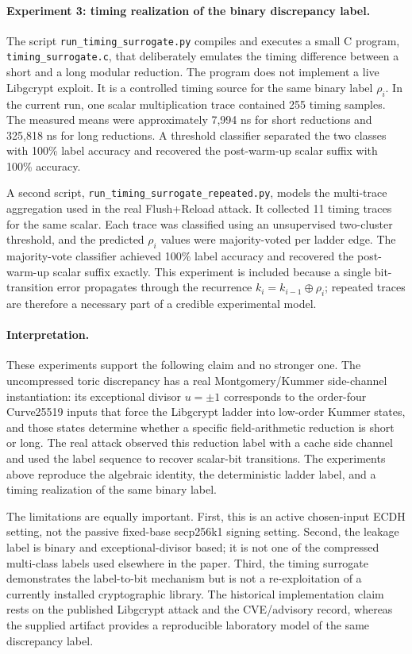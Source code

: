 \paragraph{Experiment 3: timing realization of the binary discrepancy label.}
The script \texttt{run\_timing\_surrogate.py} compiles and executes a small C
program, \texttt{timing\_surrogate.c}, that deliberately emulates the timing
difference between a short and a long modular reduction.  The program does not
implement a live Libgcrypt exploit.  It is a controlled timing source for the
same binary label \(\rho_i\).  In the current run, one scalar multiplication
trace contained 255 timing samples.  The measured means were approximately
7,994 ns for short reductions and 325,818 ns for long reductions.  A threshold
classifier separated the two classes with 100\% label accuracy and recovered the
post-warm-up scalar suffix with 100\% accuracy.

A second script, \texttt{run\_timing\_surrogate\_repeated.py}, models the
multi-trace aggregation used in the real Flush+Reload attack.  It collected 11
timing traces for the same scalar.  Each trace was classified using an
unsupervised two-cluster threshold, and the predicted \(\rho_i\) values were
majority-voted per ladder edge.  The majority-vote classifier achieved 100\%
label accuracy and recovered the post-warm-up scalar suffix exactly.  This
experiment is included because a single bit-transition error propagates through
the recurrence \(k_i=k_{i-1}\oplus\rho_i\); repeated traces are therefore a
necessary part of a credible experimental model.

\paragraph{Interpretation.}
These experiments support the following claim and no stronger one.  The
uncompressed toric discrepancy has a real Montgomery/Kummer side-channel
instantiation: its exceptional divisor \(u=\pm1\) corresponds to the order-four
Curve25519 inputs that force the Libgcrypt ladder into low-order Kummer states,
and those states determine whether a specific field-arithmetic reduction is
short or long.  The real attack observed this reduction label with a cache
side channel and used the label sequence to recover scalar-bit transitions.  The
experiments above reproduce the algebraic identity, the deterministic ladder
label, and a timing realization of the same binary label.

The limitations are equally important.  First, this is an active chosen-input
ECDH setting, not the passive fixed-base secp256k1 signing setting.  Second, the
leakage label is binary and exceptional-divisor based; it is not one of the
compressed multi-class labels used elsewhere in the paper.  Third, the timing
surrogate demonstrates the label-to-bit mechanism but is not a re-exploitation
of a currently installed cryptographic library.  The historical implementation
claim rests on the published Libgcrypt attack and the CVE/advisory record,
whereas the supplied artifact provides a reproducible laboratory model of the
same discrepancy label.

